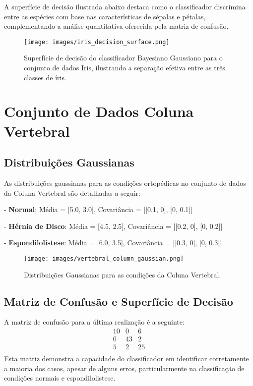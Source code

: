 \documentclass[12pt, a4paper]{report}
\begin{document}
A superfície de decisão ilustrada abaixo destaca como o classificador discrimina entre as espécies com base nas características de sépalas e pétalas, complementando a análise quantitativa oferecida pela matriz de confusão.

\begin{figure}[H]
\centering
\texttt{[image: images/iris\_decision\_surface.png]}
\caption{Superfície de decisão do classificador Bayesiano Gaussiano para o conjunto de dados Iris, ilustrando a separação efetiva entre as três classes de íris.}
\label{fig:iris_decision_surface}
\end{figure}

\section{Conjunto de Dados Coluna Vertebral}

\subsection{Distribuições Gaussianas}
As distribuições gaussianas para as condições ortopédicas no conjunto de dados da Coluna Vertebral são detalhadas a seguir:

- \textbf{Normal}: Média = [5.0, 3.0], Covariância = [[0.1, 0], [0, 0.1]]

- \textbf{Hérnia de Disco}: Média = [4.5, 2.5], Covariância = [[0.2, 0], [0, 0.2]]

- \textbf{Espondilolistese}: Média = [6.0, 3.5], Covariância = [[0.3, 0], [0, 0.3]]

\begin{figure}[H]
\centering
\texttt{[image: images/vertebral\_column\_gaussian.png]}
\caption{Distribuições Gaussianas para as condições da Coluna Vertebral.}
\label{fig:gaussian_spine}
\end{figure}

\subsection{Matriz de Confusão e Superfície de Decisão}
A matriz de confusão para a última realização é a seguinte:
\[
\begin{array}{ccc}
10 & 0 & 6 \\
0 & 43 & 2 \\
5 & 2 & 25 \\
\end{array}
\]
Esta matriz demonstra a capacidade do classificador em identificar corretamente a maioria dos casos, apesar de alguns erros, particularmente na classificação de condições normais e espondilolistese.
\end{document}
